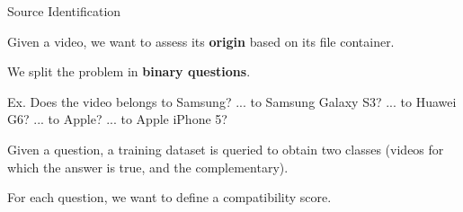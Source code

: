 \begin{tframe}{Source Identification}

\vspace{0.1cm}

Given a video, we want to assess its \textbf{origin} based on its file container.

\vspace{0.5cm}

We split the problem in \textbf{binary questions}.

\vspace{0.5cm}

Ex. Does the video belongs to Samsung? \newline
	 ... to Samsung Galaxy S3? \newline
	 ... to Huawei G6? \newline
	 ... to Apple? \newline
	 ... to Apple iPhone 5? \newline
	 
\vspace{0.3cm}

Given a question, a training dataset is queried to obtain two classes (videos for which the answer is true, and the complementary).

\vspace{0.3cm}

For each question, we want to define a compatibility score.

\end{tframe}

